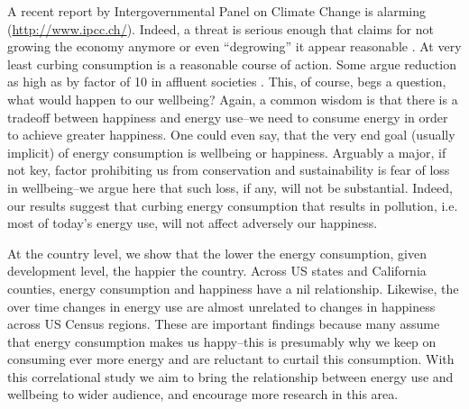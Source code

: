 \documentclass[10pt, letterpaper]{article}
\begin{document}
\begin{spacing}{1.4}
A recent report by
Intergovernmental Panel on Climate Change is alarming 
(\url{http://www.ipcc.ch/}). %
Indeed, a threat is serious enough that
claims for not growing the economy anymore or even ``degrowing'' it
appear reasonable \cite{kallis11, kallis12}. %
At very
least curbing consumption is a reasonable course of action. Some argue reduction as high
as by factor of 10 in affluent societies \cite{pretty13}. This,
of course, begs a question, what would happen to our wellbeing?
 Again, a common %
wisdom is that there is a tradeoff between happiness and
energy use--we need to consume energy in order to achieve greater
happiness. One could even say, that the very end goal (usually implicit)
of energy consumption is wellbeing or happiness.  %
%
Arguably a major, if not key, factor prohibiting us from conservation and
sustainability is fear of loss in wellbeing--we argue here that such loss, if
any,  will
not be substantial. Indeed, our results suggest that curbing energy consumption that results
in pollution, i.e. most of today's energy use, will not affect adversely our
happiness.  %

At the country level, we show that the lower the energy consumption, given development
level, the happier the country.  Across US states and California counties,
energy consumption and happiness have a nil relationship. 
Likewise, the over time changes in energy use are almost unrelated to changes in
 happiness across US Census regions. 
These are important findings  because many assume that energy consumption makes us
happy--this is presumably why we keep on consuming ever more energy and are
reluctant to curtail this consumption. %
With this correlational study we aim to bring the relationship between energy
use and wellbeing to wider audience, and encourage more research in this area. 


\end{spacing}
\end{document}
